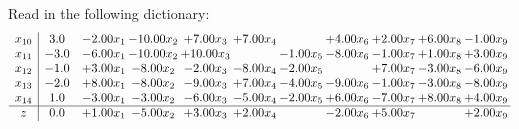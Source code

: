 \documentclass[9pt]{article}
\begin{document}
Read in the following dictionary:
\[\begin{array}{c| c c@{\hskip 2pt} c@{\hskip 2pt} c@{\hskip 2pt} c@{\hskip 2pt} c@{\hskip 2pt} c@{\hskip 2pt} c@{\hskip 2pt} c@{\hskip 2pt} c@{\hskip 2pt} }
 x_{10}   &  3.0 & -2.00 x_{1} & -10.00 x_{2} & +  7.00 x_{3} & +  7.00 x_{4} &   & +  4.00 x_{6} & +  2.00 x_{7} & +  6.00 x_{8} & -1.00 x_{9}\\
 x_{11}   &  -3.0 & -6.00 x_{1} & -10.00 x_{2} & + 10.00 x_{3} &   & -1.00 x_{5} & -8.00 x_{6} & -1.00 x_{7} & +  1.00 x_{8} & +  3.00 x_{9}\\
 x_{12}   &  -1.0 & +  3.00 x_{1} & -8.00 x_{2} & -2.00 x_{3} & -8.00 x_{4} & -2.00 x_{5} &   & +  7.00 x_{7} & -3.00 x_{8} & -6.00 x_{9}\\
 x_{13}   &  -2.0 & +  8.00 x_{1} & -8.00 x_{2} & -9.00 x_{3} & +  7.00 x_{4} & -4.00 x_{5} & -9.00 x_{6} & -1.00 x_{7} & -3.00 x_{8} & -8.00 x_{9}\\
 x_{14}   &  1.0 & -3.00 x_{1} & -3.00 x_{2} & -6.00 x_{3} & -5.00 x_{4} & -2.00 x_{5} & +  6.00 x_{6} & -7.00 x_{7} & +  8.00 x_{8} & +  4.00 x_{9}\\
\hline
z    &  0.0 & +  1.00 x_{1} & -5.00 x_{2} & +  3.00 x_{3} & +  2.00 x_{4} &   & -2.00 x_{6} & +  5.00 x_{7} &   & +  2.00 x_{9}\\
\end{array}\]
\end{document}
